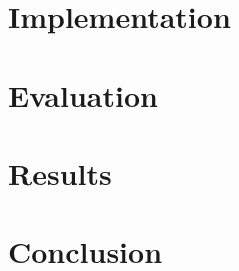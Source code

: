 \documentclass{llncs}
\begin{document}
\section{Implementation}
\label{sec:implementation}


\section{Evaluation}
\label{sec:evaluation}


\section{Results}
\label{sec:results}


\section{Conclusion}
\label{sec:conclusion}




\end{document}
